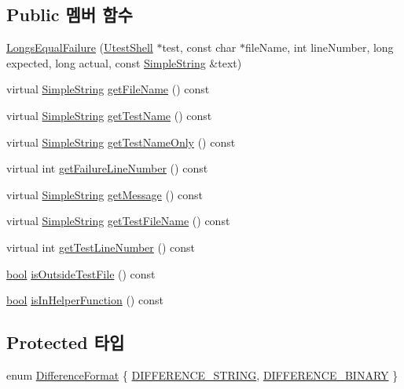 \subsection*{Public 멤버 함수}
\begin{DoxyCompactItemize}
\item 
\hyperlink{class_longs_equal_failure_a75845b79cfde1a0f3076fad7f57a3945}{Longs\+Equal\+Failure} (\hyperlink{class_utest_shell}{Utest\+Shell} $\ast$test, const char $\ast$file\+Name, int line\+Number, long expected, long actual, const \hyperlink{class_simple_string}{Simple\+String} \&text)
\item 
virtual \hyperlink{class_simple_string}{Simple\+String} \hyperlink{class_test_failure_ac74fa65c497d9a175304a14ffafcaa1a}{get\+File\+Name} () const 
\item 
virtual \hyperlink{class_simple_string}{Simple\+String} \hyperlink{class_test_failure_a02da3865d8c38e5fd122a08a5e23773e}{get\+Test\+Name} () const 
\item 
virtual \hyperlink{class_simple_string}{Simple\+String} \hyperlink{class_test_failure_ac5e7fcbcf3831504c42ee41691b0a7e7}{get\+Test\+Name\+Only} () const 
\item 
virtual int \hyperlink{class_test_failure_a9d41f8ad9667ed1f471676d49a655ec7}{get\+Failure\+Line\+Number} () const 
\item 
virtual \hyperlink{class_simple_string}{Simple\+String} \hyperlink{class_test_failure_a55ca73e984d01e477b9cc990acf7dffd}{get\+Message} () const 
\item 
virtual \hyperlink{class_simple_string}{Simple\+String} \hyperlink{class_test_failure_a2fb8d164bb0730492e0140ec8080f13f}{get\+Test\+File\+Name} () const 
\item 
virtual int \hyperlink{class_test_failure_a9fd9b831dfada83bbc2a1847918080a6}{get\+Test\+Line\+Number} () const 
\item 
\hyperlink{avb__gptp_8h_af6a258d8f3ee5206d682d799316314b1}{bool} \hyperlink{class_test_failure_a977b24b749f7dc0d279fed902991c7b4}{is\+Outside\+Test\+File} () const 
\item 
\hyperlink{avb__gptp_8h_af6a258d8f3ee5206d682d799316314b1}{bool} \hyperlink{class_test_failure_a8658daf09d68f724672ed9c7b1d94e95}{is\+In\+Helper\+Function} () const 
\end{DoxyCompactItemize}
\subsection*{Protected 타입}
\begin{DoxyCompactItemize}
\item 
enum \hyperlink{class_test_failure_aaadecd271c82449768993cbf919de0a2}{Difference\+Format} \{ \hyperlink{class_test_failure_aaadecd271c82449768993cbf919de0a2a1246a1a469970104212c9113e3f057c9}{D\+I\+F\+F\+E\+R\+E\+N\+C\+E\+\_\+\+S\+T\+R\+I\+NG}, 
\hyperlink{class_test_failure_aaadecd271c82449768993cbf919de0a2af76cc43dfdf0618b3cb16196894d5929}{D\+I\+F\+F\+E\+R\+E\+N\+C\+E\+\_\+\+B\+I\+N\+A\+RY}
 \}
\end{DoxyCompactItemize}
